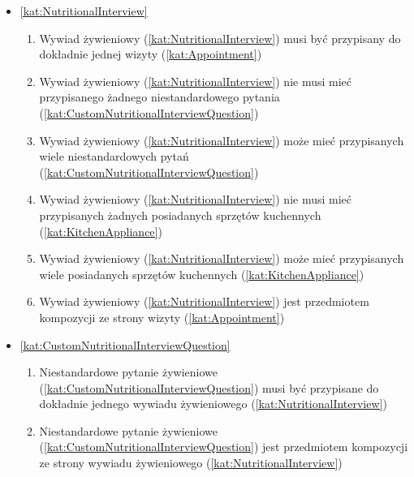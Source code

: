 \begin{itemize}[label={\textbf{Reguły dla}}, wide, labelwidth=!, labelindent=0pt]
\begin{enumerate}[label={\textbf{REG/4/\protect\twodigits{\arabic{enumi}}}}, wide, labelwidth=!, align=left, leftmargin=3cm, resume]
    \end{enumerate}
    \item\ref{kat:NutritionalInterview}\mynobreakpar
    \begin{enumerate}[label={\textbf{REG/4/\protect\twodigits{\arabic{enumi}}}}, wide, labelwidth=!, align=left, leftmargin=3cm, resume]
        \item Wywiad żywieniowy (\ref{kat:NutritionalInterview}) musi być przypisany do dokładnie jednej wizyty (\ref{kat:Appointment})
        \item Wywiad żywieniowy (\ref{kat:NutritionalInterview}) nie musi mieć przypisanego żadnego niestandardowego pytania (\ref{kat:CustomNutritionalInterviewQuestion})
        \item Wywiad żywieniowy (\ref{kat:NutritionalInterview}) może mieć przypisanych wiele niestandardowych pytań (\ref{kat:CustomNutritionalInterviewQuestion})
        \item Wywiad żywieniowy (\ref{kat:NutritionalInterview}) nie musi mieć przypisanych żadnych posiadanych sprzętów kuchennych (\ref{kat:KitchenAppliance})
        \item Wywiad żywieniowy (\ref{kat:NutritionalInterview}) może mieć przypisanych wiele posiadanych sprzętów kuchennych (\ref{kat:KitchenAppliance})
        \item Wywiad żywieniowy (\ref{kat:NutritionalInterview}) jest przedmiotem kompozycji ze strony wizyty (\ref{kat:Appointment})
    \end{enumerate}
    \item\ref{kat:CustomNutritionalInterviewQuestion}\mynobreakpar
    \begin{enumerate}[label={\textbf{REG/4/\protect\twodigits{\arabic{enumi}}}}, wide, labelwidth=!, align=left, leftmargin=3cm, resume]
        \item Niestandardowe pytanie żywieniowe (\ref{kat:CustomNutritionalInterviewQuestion}) musi być przypisane do dokładnie jednego wywiadu żywieniowego (\ref{kat:NutritionalInterview})
        \item  Niestandardowe pytanie żywieniowe (\ref{kat:CustomNutritionalInterviewQuestion}) jest przedmiotem kompozycji ze strony wywiadu żywieniowego (\ref{kat:NutritionalInterview})
    \end{enumerate}

\end{itemize}
